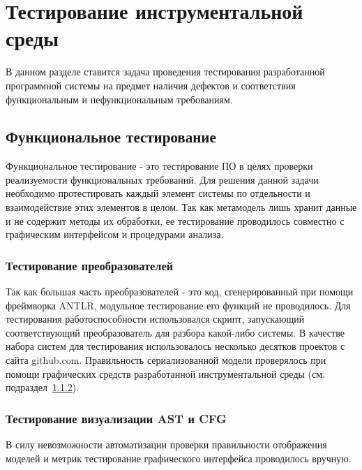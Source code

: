\chapter{Тестирование инструментальной среды}
\label{chap:testing}

В данном разделе ставится задача проведения тестирования разработанной
программной системы на предмет наличия дефектов и соответствия функциональным
и нефункциональным требованиям.

\section{Функциональное тестирование}

Функциональное тестирование - это тестирование ПО в целях проверки реализуемости
функциональных требований. Для решения данной задачи необходимо протестировать
каждый элемент системы по отдельности и взаимодействие этих элементов в целом.
Так как метамодель лишь хранит данные и не содержит методы их обработки, ее
тестирование проводилось совместно с графическим интерфейсом и процедурами
анализа.

\subsection{Тестирование преобразователей}

Так как большая часть преобразователей - это код, сгенерированный при помощи
фреймворка ANTLR, модульное тестирование его функций не проводилось. Для
тестирования работоспособности использовался скрипт, запускающий соответствующий
преобразователь для разбора какой-либо системы. В качестве набора систем для
тестирования использовалось несколько десятков проектов с сайта github.com.
Правильность сериализованной модели проверялось при помощи графических средств
разработанной инструментальной среды (см. подраздел~\ref{subsec:graph_test}).

\subsection{Тестирование визуализации AST и CFG}
\label{subsec:graph_test}

В силу невозможности автоматизации проверки правильности отображения моделей и
метрик тестирование графического интерфейса проводилось вручную.

